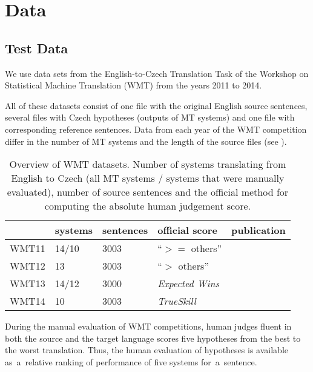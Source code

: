\chapter{Data}

\section{Test Data}

We use data sets from the English-to-Czech Translation Task of the Workshop on
Statistical Machine Translation (WMT) from the years 2011 to 2014.

All of these datasets consist of one file with the original English source sentences,
several files with Czech hypotheses (outputs of MT systems) and one file with corresponding 
reference sentences. Data from each year of the WMT competition differ in the 
number of MT systems and the length of the source files (see ). 


\begin{table}[h]
\centering
\begin{tabular}{l|l|l|l|l}
      & systems & sentences & official score & publication\\
\hline
WMT11 & 14/10    & 3003      & “$ >= $ others”      & \cite{wmt11}  \\
WMT12 & 13          & 3003      & “$ > $ others”      & \cite{wmt12}  \\
WMT13 & 14/12    & 3000      & \textit{Expected Wins} & \cite{wmt13}  \\
WMT14 & 10          & 3003      & \textit{TrueSkill}   & \cite{wmt14}
\end{tabular}
\caption{Overview of WMT datasets. Number of systems translating from English 
to Czech (all MT systems / systems that were manually evaluated), number of 
source sentences and the official method for computing the absolute human 
judgement score.}
\label{wmt-data}
\end{table}

During the manual evaluation of WMT competitions, human judges fluent in both
the source and the target language scores five hypotheses from the best to
the worst translation. Thus, the human evaluation of hypotheses is available 
as~a~relative ranking of performance of five systems for~a~sentence. 

